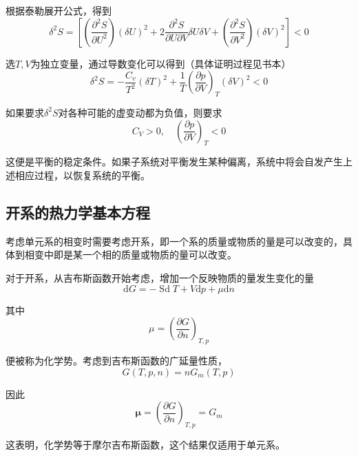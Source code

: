 \documentclass[UTF8]{ctexart}
\begin{document}
	根据泰勒展开公式，得到
	\begin{equation}
	\delta^{2} S=\left[\left(\frac{\partial^{2} S}{\partial U^{2}}\right)(\delta U)^{2}+2 \frac{\partial^{2} S}{\partial U \partial V} \delta U \delta V+\left(\frac{\partial^{2} S}{\partial V^{2}}\right)(\delta V)^{2}\right]<0
	\end{equation}
	
\noindent 选$ T,V $为独立变量，通过导数变化可以得到（具体证明过程见书本）
\begin{equation}
\delta^{2} S=-\frac{C_{v}}{T^{2}}(\delta T)^{2}+\frac{1}{T}\left(\frac{\partial p}{\partial V}\right)_{T}(\delta V)^{2}<0
\end{equation}

\noindent 如果要求$ \delta^{2} S $对各种可能的虚变动都为负值，则要求
\begin{equation}
C_{V}>0, \quad\left(\frac{\partial p}{\partial V}\right)_{T}<0
\end{equation}

\noindent 这便是平衡的稳定条件。如果子系统对平衡发生某种偏离，系统中将会自发产生上述相应过程，以恢复系统的平衡。

	\subsection{开系的热力学基本方程}
	考虑单元系的相变时需要考虑开系，即一个系的质量或物质的量是可以改变的，具体到相变中即是某一个相的质量或物质的量可以改变。
	
	对于开系，从吉布斯函数开始考虑，增加一个反映物质的量发生变化的量
	\begin{equation}
	\mathrm{d} G=-\operatorname{Sd} T+V \mathrm{d} p+\mu \mathrm{d} n
	\end{equation}
	
\noindent 其中
\begin{equation}
\mu=\left(\frac{\partial G}{\partial n}\right)_{T, p}
\end{equation}

\noindent 便被称为化学势。考虑到吉布斯函数的广延量性质，
\begin{equation}
G(T, p, n)=n G_{m}(T, p)
\end{equation}

\noindent 因此
\begin{equation}
\boldsymbol{\mu}=\left(\frac{\partial G}{\partial n}\right)_{T,p}=G_{m}
\end{equation}

\noindent 这表明，化学势等于摩尔吉布斯函数，这个结果仅适用于单元系。
\end{document}
